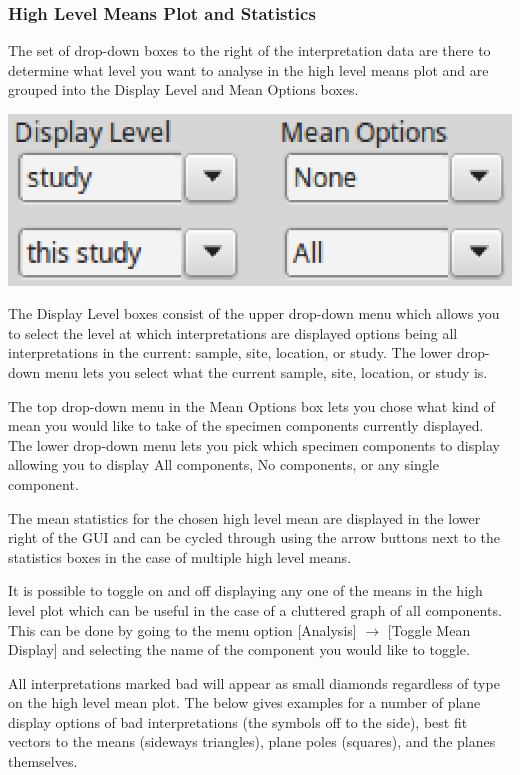 \documentclass[11pt]{book}
\begin{document}
{\subsubsection{High Level Means Plot and
Statistics}\label{higher-level-plots-and-interpretation}

The set of drop-down boxes to the right of the interpretation data are there to determine what level you want to analyse in the high level means plot and are grouped into the Display Level and Mean Options boxes.

\includegraphics[width=8 cm]{EPSFiles/demag_gui_HighLevel.eps}

\noindent The Display Level boxes consist of the upper drop-down menu which allows you to select the level at which interpretations are displayed options being all interpretations in the current: sample, site, location, or study. The lower drop-down menu lets you select what the current sample, site, location, or study is.

\noindent The top drop-down menu in the Mean Options box lets you chose what kind of mean you would like to take of the specimen components currently displayed. The lower drop-down menu lets you pick which specimen components to display allowing you to display All components, No components, or any single component.

\noindent The mean statistics for the chosen high level mean are displayed in the lower right of the GUI and can be cycled through using the arrow buttons next to the statistics boxes in the case of multiple high level means.

\noindent It is possible to toggle on and off displaying any one of the means in the high level plot which can be useful in the case of a cluttered graph of all components. This can be done by going to the menu option [Analysis] $\rightarrow$ [Toggle Mean Display] and selecting the name of the component you would like to toggle.

\noindent All interpretations marked bad will appear as small diamonds regardless of type on the high level mean plot. The below gives examples for a number of plane display options of bad interpretations (the symbols off to the side), best fit vectors to the means (sideways triangles), plane poles (squares), and the planes themselves.

}
\end{document}
